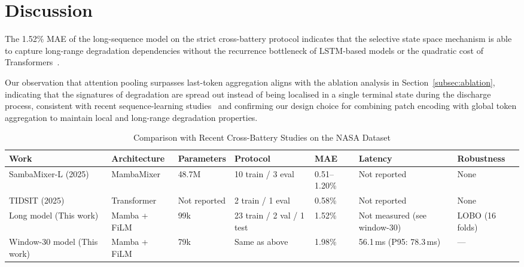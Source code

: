 \section{Discussion}
\label{sec:discussion}

The 1.52\% MAE of the long-sequence model on the strict cross-battery protocol
indicates that the selective state space mechanism is able to capture long-range
degradation dependencies without the recurrence bottleneck of LSTM-based models
or the quadratic cost of Transformers~\cite{gu2023,meng2026,zhao2024}.

Our observation that attention pooling surpasses last-token aggregation aligns
with the ablation analysis in Section~\ref{subsec:ablation}, indicating that the
signatures of degradation are spread out instead of being localised in a single
terminal state during the discharge process, consistent with recent
sequence-learning studies~\cite{meng2026,nie2023} and confirming our design
choice for combining patch encoding with global token aggregation to maintain
local and long-range degradation properties.

\begin{table}[H]
  \caption{Comparison with Recent Cross-Battery Studies on the NASA Dataset}
  \label{tab:comparison}
  \centering
  \scriptsize
  \linespread{0.92}\selectfont
  \tabtight
  \setlength{\tabcolsep}{2pt}%
  \begin{tabularx}{\textwidth}{|M{1.7cm}|M{1.8cm}|M{1.6cm}|Y|Y|Y|M{1.6cm}|}
    \hline
    \textbf{Work} & \textbf{Architecture} & \textbf{Parameters} &
    \textbf{Protocol} & \textbf{MAE} & \textbf{Latency} &
    \textbf{Robustness} \\
    \hline
    SambaMixer-L (2025)
      & MambaMixer & 48.7M & 10 train / 3 eval & 0.51--1.20\%
      & Not reported & None \\
    \hline
    TIDSIT (2025)
      & Transformer & Not reported & 2 train / 1 eval & 0.58\%
      & Not reported & None \\
    \hline
    Long model (This work)
      & Mamba + FiLM & 99k & 23 train / 2 val / 1 test & 1.52\%
      & Not measured (see window-30) & LOBO (16 folds) \\
    \hline
    Window-30 model (This work)
      & Mamba + FiLM & 79k & Same as above & 1.98\%
      & 56.1\,ms (P95: 78.3\,ms) & --- \\
    \hline
  \end{tabularx}
\end{table}

